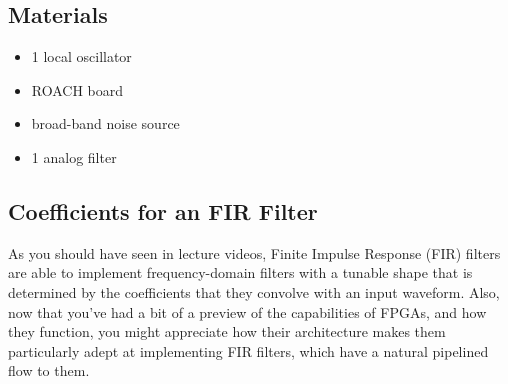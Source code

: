 \documentclass[11pt]{article}
\begin{document}
\subsection*{Materials}

\begin{itemize}[noitemsep,nolistsep]
\item 1 local oscillator
\item ROACH board
\item broad-band noise source
\item 1 analog filter
\end{itemize}

\subsection{Coefficients for an FIR Filter} \label{fir_filter}

As you should have seen in lecture videos, Finite Impulse Response (FIR) filters are
able to implement frequency-domain filters with a tunable shape that is determined
by the coefficients that they convolve with an input waveform.
Also, now that you've had a bit of a preview of the capabilities of FPGAs, and how they function,
you might appreciate how their architecture makes them particularly adept at implementing
FIR filters, which have a natural pipelined flow to them.
\end{document}
